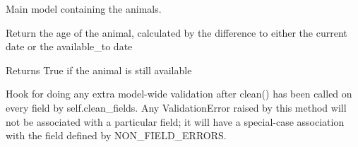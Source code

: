 \documentclass[letterpaper,10pt,openany,oneside,english]{sphinxmanual}
\begin{document}
\begin{fulllineitems}
\label{\detokenize{index:animals.models.Animal}}
Main model containing the animals.

\begin{fulllineitems}
\label{\detokenize{index:animals.models.Animal.DoesNotExist}}
\end{fulllineitems}


\begin{fulllineitems}
\label{\detokenize{index:animals.models.Animal.MultipleObjectsReturned}}
\end{fulllineitems}


\begin{fulllineitems}
\label{\detokenize{index:animals.models.Animal.age}}
Return the age of the animal, calculated by the difference to either
the current date or the available\_to date

\end{fulllineitems}


\begin{fulllineitems}
\label{\detokenize{index:animals.models.Animal.available}}
Returns True if the animal is still available

\end{fulllineitems}


\begin{fulllineitems}
\label{\detokenize{index:animals.models.Animal.clean}}
Hook for doing any extra model-wide validation after clean() has been
called on every field by self.clean\_fields. Any ValidationError raised
by this method will not be associated with a particular field; it will
have a special-case association with the field defined by NON\_FIELD\_ERRORS.


\end{fulllineitems}
\end{fulllineitems}
\end{document}
